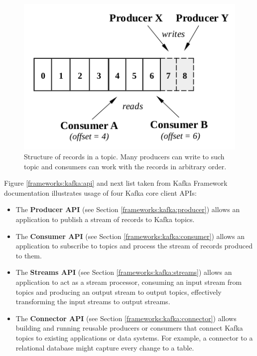 \begin{figure}[h]
  \center
  \includegraphics{img/kafka-topic-structure.png}
  \caption{Structure of records in a topic. Many producers can write to such topic and consumers can work with the records in arbitrary order.}
  \label{frameworks:kafka:topic}
\end{figure}

Figure \ref{frameworks:kafka:api} and next list taken from Kafka Framework documentation \citep{Kafka}
illustrates usage of four Kafka core client APIs:
\begin{itemize}
  \item The \textbf{Producer API} (see Section \ref{frameworks:kafka:producer}) allows an application to publish
    a stream of records to Kafka topics.
  \item The \textbf{Consumer API} (see Section \ref{frameworks:kafka:consumer}) allows an application to subscribe
    to topics and process the stream of records produced to them.
  \item The \textbf{Streams API} (see Section \ref{frameworks:kafka:streams}) allows an application to act as a stream processor,
    consuming an input stream from topics and producing an output stream to output topics,
    effectively transforming the input streams to output streams.
  \item The \textbf{Connector API} (see Section \ref{frameworks:kafka:connector}) allows building and running reusable producers or consumers
    that connect Kafka topics to existing applications or data systems.
    For example, a connector to a relational database might capture every change to a table. 
\end{itemize}


